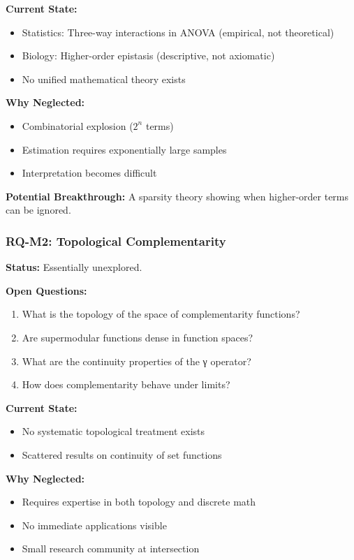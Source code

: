 \textbf{Current State:}
\begin{itemize}[noitemsep]
    \item Statistics: Three-way interactions in ANOVA (empirical, not theoretical)
    \item Biology: Higher-order epistasis (descriptive, not axiomatic)
    \item No unified mathematical theory exists
\end{itemize}

\textbf{Why Neglected:}
\begin{itemize}[noitemsep]
    \item Combinatorial explosion ($2^n$ terms)
    \item Estimation requires exponentially large samples
    \item Interpretation becomes difficult
\end{itemize}

\textbf{Potential Breakthrough:} A sparsity theory showing when higher-order terms can be ignored.

\subsubsection{RQ-M2: Topological Complementarity}

\textbf{Status:} Essentially unexplored.

\textbf{Open Questions:}
\begin{enumerate}[noitemsep]
    \item What is the topology of the space of complementarity functions?
    \item Are supermodular functions dense in function spaces?
    \item What are the continuity properties of the γ operator?
    \item How does complementarity behave under limits?
\end{enumerate}

\textbf{Current State:}
\begin{itemize}[noitemsep]
    \item No systematic topological treatment exists
    \item Scattered results on continuity of set functions
\end{itemize}

\textbf{Why Neglected:}
\begin{itemize}[noitemsep]
    \item Requires expertise in both topology and discrete math
    \item No immediate applications visible
    \item Small research community at intersection
\end{itemize}

